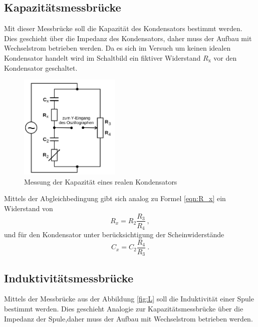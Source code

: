 \subsection{Kapazitätsmessbrücke}
Mit dieser Messbrücke soll die Kapazität des Kondensators bestimmt werden. Dies geschieht über die Impedanz des Kondensators, daher muss der Aufbau mit Wechselstrom betrieben werden. Da es sich im Versuch um keinen idealen Kondensator handelt wird im Schaltbild ein fiktiver Widerstand $R_\text{x}$ vor den Kondensator geschaltet.
\begin{figure}
  \centering
  \includegraphics[height=5cm]{picture/3.png}
  \caption{Messung der Kapazität eines realen Kondensators \cite{sample}}
  \label{fig:C}
\end{figure}
Mittels der Abgleichbedingung gibt sich analog zu Formel \ref{eqn:R_x} ein Widerstand von
\begin{equation*}
    R_x = R_2 \frac{R_3}{R_4} \ ,
\end{equation*}
und für den Kondensator unter berücksichtigung der Scheinwiderstände
\begin{equation}
  C_x = C_2 \frac{R_4}{R_3} \ .
  \label{eqn:C_x}
\end{equation}

\subsection{Induktivitätsmessbrücke}
Mittels der Messbrücke aus der Abbildung \ref{fig:L} soll die Induktivität einer Spule bestimmt werden. Dies geschieht Analogie zur Kapazitätsmessbrücke über die Impedanz der Spule,daher muss der Aufbau mit Wechselstrom betrieben werden.

